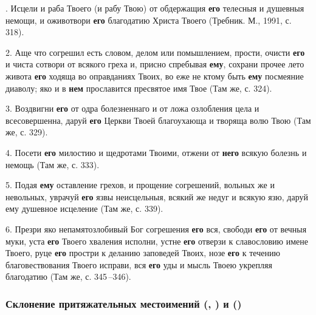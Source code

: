 \documentclass[11pt,a4paper,oneside]{memoir}
\begin{document}
. Исцели и раба Твоего (и рабу Твою) от обдержащия \textbf{его} телесныя и душевныя немощи, и оживотвори \textbf{его} благодатию Христа Твоего (Требник. М., 1991, с. 318).

2. Аще что согрешил есть словом, делом или помышлением, прости, очисти \textbf{его} и чиста сотвори от всякого греха и, присно спребывая \textbf{ему}, сохрани прочее лето живота \textbf{его} ходяща во оправданиях Твоих, во еже не ктому быть \textbf{ему} посмеяние диаволу; яко и в \textbf{нем} прославится пресвятое имя Твое (Там же, с. 324).

3. Воздвигни \textbf{его} от одра болезненнаго и от ложа озлобления цела и всесовершенна, даруй \textbf{его} Церкви Твоей благоухающа и творяща волю Твою (Там же, с. 329).

4. Посети \textbf{его} милостию и щедротами Твоими, отжени от \textbf{него} всякую болезнь и немощь (Там же, с. 333).

5. Подая \textbf{ему} оставление грехов, и прощение согрешений, вольных же и невольных, уврачуй \textbf{его} язвы неисцельныя, всякий же недуг и всякую язю, даруй ему душевное исцеление (Там же, с. 339).

6. Презри яко непамятозлобивый Бог согрешения \textbf{его} вся, свободи \textbf{его} от вечныя муки, уста \textbf{его} Твоего хваления исполни, устне \textbf{его} отверзи к славословию имене Твоего, руце \textbf{его} простри к деланию заповедей Твоих, нозе \textbf{его} к течению благовествования Твоего исправи, вся \textbf{его} уды и мысль Твоею укрепляя благодатию (Там же, с. 345\,--346).

\subsubsection[Склонение притяжательных местоимений]{Склонение притяжательных местоимений {} ({}, {}) и {} ({})}
\end{document}
